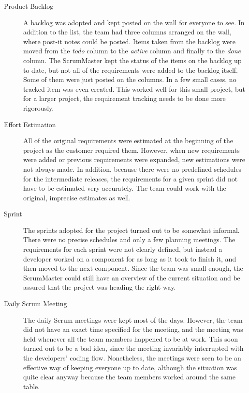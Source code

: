 \begin{description}

\item[Product Backlog] A backlog was adopted and kept posted on the 
wall for everyone to see. In addition to the list, the team had three 
columns arranged on the wall, where post-it notes could be posted. 
Items taken from the backlog were moved from the \textsl{todo} column 
to the \textsl{active} column and finally to the \textsl{done} column. 
The ScrumMaster kept the status of the items on the backlog up to 
date, but not all of the requirements were added to the backlog 
itself. Some of them were just posted on the columns. In a few small 
cases, no tracked item was even created. This worked well for this 
small project, but for a larger project, the requirement tracking 
needs to be done more rigorously.

\item[Effort Estimation] All of the original requirements were 
estimated at the beginning of the project as the customer required 
them. However, when new requirements were added or previous 
requirements were expanded, new estimations were not always made. In 
addition, because there were no predefined schedules for the 
intermediate releases, the requirements for a given sprint did not 
have to be estimated very accurately. The team could work with the 
original, imprecise estimates as well.

\item[Sprint] The sprints adopted for the project turned out to be 
somewhat informal. There were no precise schedules and only a few 
planning meetings. The requirements for each sprint were not clearly 
defined, but instead a developer worked on a component for as long as 
it took to finish it, and then moved to the next component. Since the 
team was small enough, the ScrumMaster could still have an overview of 
the current situation and be assured that the project was heading the 
right way.

\item[Daily Scrum Meeting] The daily Scrum meetings were kept most of 
the days. However, the team did not have an exact time specified for 
the meeting, and the meeting was held whenever all the team members 
happened to be at work. This soon turned out to be a bad idea, since 
the meeting invariably interrupted with the developers' coding flow. 
Nonetheless, the meetings were seen to be an effective way of keeping 
everyone up to date, although the situation was quite clear anyway 
because the team members worked around the same table.

\end{description}

